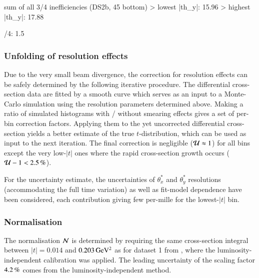 \> sum of all 3/4 inefficiencies (DS2b, 45 bottom)
\>> lowest |th_y|: 15.96%
\>> highest |th_y|: 17.88%

/4: 1.5%

\fi



\subsubsection{Unfolding of resolution effects}
\label{sec:unfolding}

Due to the very small beam divergence, the correction for resolution effects can be safely determined by the following iterative procedure. The differential cross-section data are fitted by a smooth curve which serves as an input to a Monte-Carlo simulation using the resolution parameters determined above. Making a ratio of simulated histograms with / without smearing effects gives a set of per-bin correction factors. Applying them to the yet uncorrected differential cross-section yields a better estimate of the true $t$-distribution, which can be used as input to the next iteration. The final correction is negligible (${\cal U} \approx 1$) for all bins except the very low-$|t|$ ones where the rapid cross-section growth occurs ($ {\cal U} - 1 < 2.5\un{\%}$).

For the uncertainty estimate, the uncertainties of $\theta_x^*$ and $\theta_y^*$ resolutions (accommodating the full time variation) as well as fit-model dependence have been considered, each contribution giving few per-mille for the lowest-$|t|$ bin.

\subsubsection{Normalisation}
\label{sec:normalisation}

The normalisation ${\cal N}$ is determined by requiring the same cross-section integral between $|t| = 0.014$ and $0.203\,{\rm GeV^2}$ as for dataset 1 from \cite{prl111}, where the luminosity-independent calibration was applied. The leading uncertainty of the scaling factor $4.2\,{\rm \%}$ comes from the luminosity-independent method.


